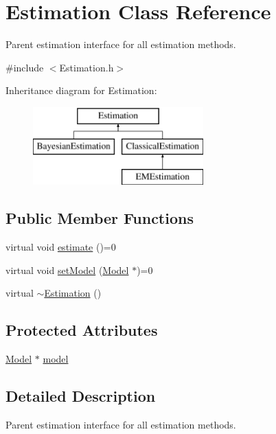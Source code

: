 \hypertarget{classEstimation}{}\section{Estimation Class Reference}
\label{classEstimation}


Parent estimation interface for all estimation methods.  




{\ttfamily \#include $<$Estimation.\+h$>$}

Inheritance diagram for Estimation\+:\begin{figure}[H]
\begin{center}
\leavevmode
\includegraphics[height=3.000000cm]{classEstimation}
\end{center}
\end{figure}
\subsection*{Public Member Functions}
\begin{DoxyCompactItemize}
\item 
virtual void \hyperlink{classEstimation_ab637475bb8ae37f256c94f7b3cdbe848}{estimate} ()=0
\item 
virtual void \hyperlink{classEstimation_a65f0bd4b60e82a2ab374abd687c69caa}{set\+Model} (\hyperlink{classModel}{Model} $\ast$)=0
\item 
virtual \hyperlink{classEstimation_a4f236659f3afc3db2ee3b6cececc7ce9}{$\sim$\+Estimation} ()
\end{DoxyCompactItemize}
\subsection*{Protected Attributes}
\begin{DoxyCompactItemize}
\item 
\hyperlink{classModel}{Model} $\ast$ \hyperlink{classEstimation_a3ee97aaf032f3522a294d934c138b29a}{model}
\end{DoxyCompactItemize}


\subsection{Detailed Description}
Parent estimation interface for all estimation methods. 

